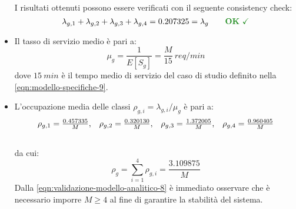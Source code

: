 \begin{itemize}
I risultati ottenuti possono essere verificati con il seguente consistency check:
\begin{equation}
\lambda_{g,1} + \lambda_{g,2} + \lambda_{g,3} + \lambda_{g,4} = 0.207325 = \lambda_g \qquad \text{\color{forestgreen}\textbf{OK} \checkmark} \\
\end{equation}

\item Il tasso di servizio medio è pari a:
\begin{equation}
\label{eqn:validazione-modello-analitico-6}
\mu_g = \frac{1}{E[S_g]} = \frac{M}{15}\ req/min
\end{equation}
dove $15\ min$ è il tempo medio di servizio del caso di studio definito nella \ref{eqn:modello-specifiche-9}.

\item L'occupazione media delle classi $\rho_{g,i} = \lambda_{g,i}/\mu_g$ è pari a:
\begin{equation}
\begin{array}{l l l l}
\rho_{g,1} = \frac{0.457335}{M}, & \rho_{g,2} = \frac{0.320130}{M}, & \rho_{g,3} = \frac{1.372005}{M}, & \rho_{g,4} = \frac{0.960405}{M} \\[1.5em]
\end{array}
\end{equation}
da cui:
\begin{equation}
\label{eqn:validazione-modello-analitico-8}
\rho_g = \sum_{i=1}^4 \rho_{g,i} = \frac{3.109875}{M}
\end{equation}
Dalla \ref{eqn:validazione-modello-analitico-8} è immediato osservare che è necessario imporre $M \geq 4$ al fine di garantire la stabilità del sistema.
\end{itemize}

